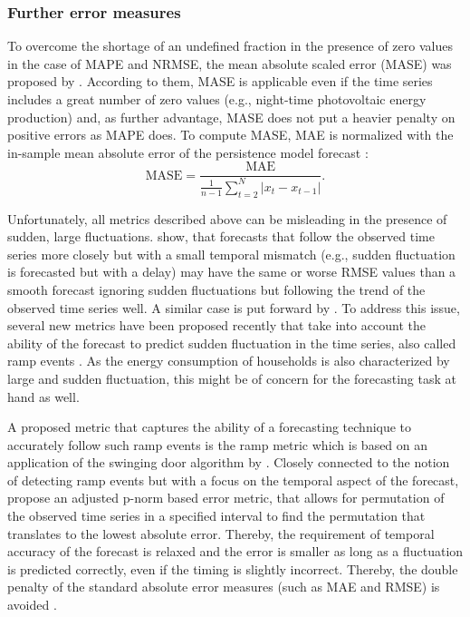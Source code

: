 \subsubsection{Further error measures}

To overcome the shortage of an undefined fraction in the presence of zero values in the case of MAPE and NRMSE, the mean absolute scaled error (MASE) was proposed by \citet{Hyndman:2006}. According to them, MASE is applicable even if the time series includes a great number of zero values (e.g., night-time photovoltaic energy production) and, as further advantage, MASE does not put a heavier penalty on positive errors as MAPE does. To compute MASE, MAE is normalized with the in-sample mean absolute error of the persistence model forecast \citep{Hyndman:2006}:
%
\begin{equation} \label{Eq:MASE}
\text{MASE}=\frac{\text{MAE}}{\frac{1}{n-1}\sum_{t=2}^N\left|x_t-x_{t-1}\right|}.
\end{equation}

Unfortunately, all metrics described above can be misleading in the presence of sudden, large fluctuations. \citet{Vallance:2017} show, that forecasts that follow the observed time series more closely but with a small temporal mismatch (e.g., sudden fluctuation is forecasted but with a delay) may have the same or worse RMSE values than a smooth forecast ignoring sudden fluctuations but following the trend of the observed time series well. A similar case is put forward by \citet{Haben:2014}. To address this issue, several new metrics have been proposed recently that take into account the ability of the forecast to predict sudden fluctuation in the time series, also called ramp events \citep{Zhang:2015}. As the energy consumption of households is also characterized by large and sudden fluctuation, this might be of concern for the forecasting task at hand as well.

A proposed metric that captures the ability of a forecasting technique to accurately follow such ramp events is the ramp metric \citep{Vallance:2017} which is based on an application of the swinging door algorithm by \citet{Florita:2013}. Closely connected to the notion of detecting ramp events but with a focus on the temporal aspect of the forecast, \citet{Haben:2014} propose an adjusted p-norm based error metric, that allows for permutation of the observed time series in a specified interval to find the permutation that translates to the lowest absolute error. Thereby, the requirement of temporal accuracy of the forecast is relaxed and the error is smaller as long as a fluctuation is predicted correctly, even if the timing is slightly incorrect. Thereby, the double penalty of the standard absolute error measures (such as MAE and RMSE) is avoided \citep{Haben:2014}.

